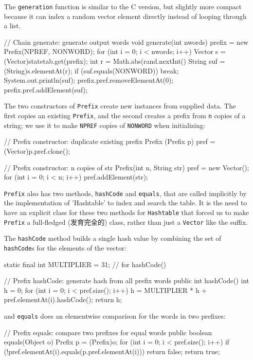 The \verb'generation' function is similar to the C version, but slightly
more compact because it can index a random vector element directly instead
of looping through a list.
\begin{wellcode}
    // Chain generate: generate output words
    void generate(int nwords)
    {
        prefix = new Prefix(NPREF, NONWORD);
        for (int i = 0; i < nwords; i++) {
            Vector s = (Vector)statetab.get(prefix);
            int r = Math.abs(rand.nextInt() %
            String suf = (String)s.elementAt(r);
            if (suf.equals(NONWORD))
                break;
            System.out.println(suf);
            prefix.pref.removeElementAt(0);
            prefix.pref.addElement(suf);
        }
    }
\end{wellcode}

The two constructors of \verb'Prefix' create new instances from supplied
data. The first copies an existing \verb'Prefix', and the second creates a
prefix from \verb'n' copies of a string; we use it to make \verb'NPREF'
copies of \verb'NONWORD' when initializing:
\begin{wellcode}
    // Prefix constructor: duplicate existing prefix
    Prefix (Prefix p)
    {
        pref = (Vector)p.pref.clone();
    }

    // Prefix constructor: n copies of str
    Prefix(int n, String str)
    {
        pref = new Vector();
        for (int i = 0; i < n; i++)
            pref.addElement(str);
    }
\end{wellcode}

\verb'Prefix' also has two methods, \verb'hashCode' and \verb'equals', that
are called implicitly by the implementation of \vebr'Hashtable' to index
and search the table. It is the need to have an explicit class for these
two methods for \verb'Hashtable' that forced us to make \verb'Prefix' a
full-fledged (发育完全的) class, rather than just a \verb'Vector' like the
suffix.

The \verb'hashCode' method builds a single hash value by combining the set
of \verb'hashCode's for the elements of the vector:
\begin{wellcode}
    static final int MULTIPLIER = 31;   // for hashCode()

    // Prefix hashCode: generate hash from all prefix words
    public int hashCode()
    {
        int h = 0;
        for (int i = 0; i < pref.size(); i++)
            h = MULTIPLIER * h + pref.elementAt(i).hashCode();
        return h;
    }
\end{wellcode}
and \verb'equals' does an elementwise comparison for the words in two
prefixes:
\begin{wellcode}
    // Prefix equals: compare two prefixes for equal words
    public boolean equals(Object o)
    {
        Prefix p = (Prefix)o;
        for (int i = 0; i < pref.size(); i++)
            if (!pref.elementAt(i).equals(p.pref.elementAt(i)))
                return false;
        return true;
    }
\end{wellcode}

